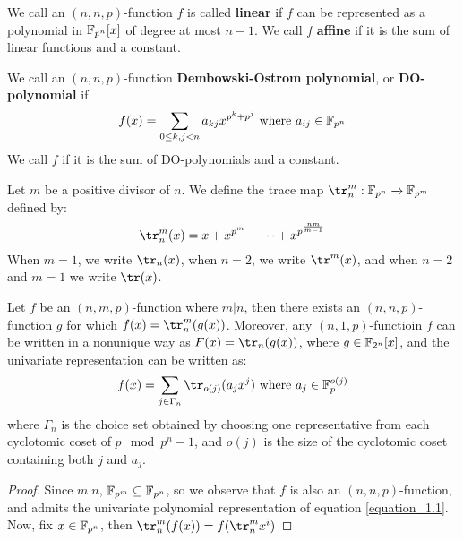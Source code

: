 \begin{definition}
  We call an $(n,n,p)$-function $f$ is called \textbf{linear} if $f$
  can be represented as a polynomial in $\mathbb{F}_{p^n}[x]$ of degree at
  most $n-1$. We call $f$ \textbf{affine} if it is the sum of linear
  functions and a constant.
\end{definition}

\begin{definition}
  We call an $(n,n,p)$-function \textbf{Dembowski-Ostrom polynomial},
  or \textbf{DO-polynomial} if
  \begin{equation}\label{equation_1.4}
    f(x)=\sum_{0 \leq k,j<n}{a_{kj}x^{p^k+p^j}} \text{ where }
    a_{ij} \in \mathbb{F}_{p^n}
  \end{equation}
  We call $f$ if it is the sum of  DO-polynomials and a constant.
\end{definition}

\begin{defintion}
  Let $m$ be a positive divisor of $n$. We define the trace map
  $\tr_n^m:\F_{p^n} \xrightarrow{} \F_{p^m}$ defined by:
  \begin{equation*}
    \tr_n^m(x)=x+x^{p^m}+ \dots +x^{p^{\frac{nm}{m-1}}}
  \end{equation*}
  When $m=1$, we write $\tr_n(x)$, when $n=2$, we write $\tr^m(x)$,
  and when $n=2$ and $m=1$ we write $\tr(x)$.
\end{defintion}

\begin{lemma}\label{lemma_1.1.2}
  Let  $f$ be an $(n,m,p)$-function where $m|n$, then there exists an
  $(n,n,p)$-function $g$ for which $f(x)=\tr_n^m(g(x))$. Moreover,
  any $(n,1,p)$-functioin $f$ can be written in a nonunique way as
  $F(x)=\tr_n(g(x))$, where $g \in \mathbb{F}_{2^n}[x]$, and the univariate
  representation can be written as:
  \begin{equation}\label{equation_1.5}
    f(x)=\sum_{j \in \Gamma_n}{\tr_{o(j)}(a_jx^j)} \text{ where }
    a_j \in \F_p^{o(j)}
  \end{equation}
  where $\Gamma_n$ is the choice set obtained by choosing one
  representative from each cyclotomic coset of $p \mod{p^n-1}$, and
  $o(j)$ is the size of the cyclotomic coset containing both $j$ and
  $a_j$.
\end{lemma}
\begin{proof}
  Since $m|n$,  $\mathbb{F}_{p^m} \subseteq \mathbb{F}_{p^n}$, so we observe that $f$
  is also an $(n,n,p)$-function, and admits the univariate polynomial
  representation of equation \ref{equation_1.1}. Now, fix $x \in
  \mathbb{F}_{p^n}$, then $\tr_n^m{(f(x))}=f(\tr_n^m{x^i})$
\end{proof}

